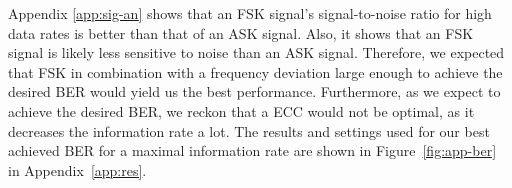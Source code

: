\documentclass[11pt,titlepage]{report}
\begin{document}
Appendix \ref{app:sig-an} shows that an FSK signal's signal-to-noise ratio for high data rates is better than that of an ASK signal. Also, it shows that an FSK signal is likely less sensitive to noise than an ASK signal. Therefore, we expected that FSK in combination with a frequency deviation large enough to achieve the desired BER would yield us the best performance. Furthermore, as we expect to achieve the desired BER, we reckon that a ECC would not be optimal, as it decreases the information rate a lot. The results and settings used for our best achieved BER for a maximal information rate are shown in Figure~\ref{fig:app-ber} in Appendix~\ref{app:res}.
\end{document}
